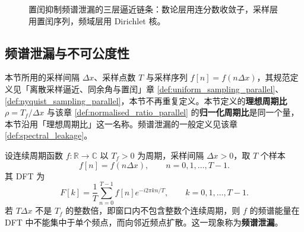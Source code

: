 \begin{figure}[htbp]
\centering
{}
\caption{置闰抑制频谱泄漏的三层逼近链条：数论层用连分数收敛子，采样层用置闰序列，频域层用 Dirichlet 核。}
\label{fig:three_layer_approximation}
\end{figure}

\subsection{频谱泄漏与不可公度性}

\begin{remark}[与离散采样章的术语衔接]\label{rem:harmonic_sampling_link}
本节所用的采样间隔 $\Delta x$、采样点数 $T$ 与采样序列 $f[n]=f(n\Delta x)$，其规范定义见「离散采样逼近、同余角与置闰」章 \cref{def:uniform_sampling_parallel}、\cref{def:nyquist_sampling_parallel}，本节不再重复定义。本节定义的\textbf{理想周期比} $\rho=T_f/\Delta x$ 与该章 \cref{def:normalised_ratio_parallel} 的\textbf{归一化周期比}是同一个量，本节沿用「理想周期比」这一名称。频谱泄漏的一般定义见该章 \cref{def:spectral_leakage}。
\end{remark}

\begin{definition}[频谱泄漏]\label{def:spectral_leakage_harmonic}
设连续周期函数 \(f:\mathbb{R}\to\mathbb{C}\) 以 \(T_f>0\) 为周期，采样间隔 \(\Delta x>0\)，取 \(T\) 个样本
\[
f[n]=f(n\Delta x),\qquad n=0,1,\dots,T-1.
\]
其 DFT 为
\[
F[k]=\frac{1}{T}\sum_{n=0}^{T-1} f[n]e^{-i2\pi kn/T},\qquad k=0,1,\dots,T-1.
\]
若 \(T\Delta x\) 不是 \(T_f\) 的整数倍，即窗口内不包含整数个连续周期，则 \(f\) 的频谱能量在 DFT 中不能集中于单个频点，而向邻近频点扩散。这一现象称为\textbf{频谱泄漏}。
\end{definition}


